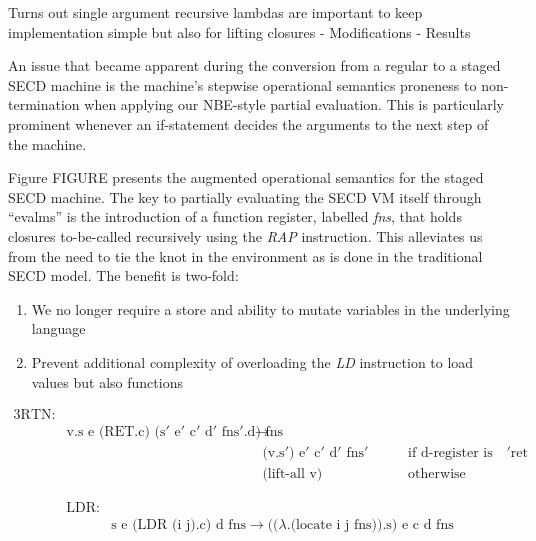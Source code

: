 \documentclass[fleqn]{article}
\theoremstyle{definition}
\begin{document}

Turns out single argument recursive lambdas are important to keep implementation simple but also for lifting closures
- Modifications
- Results

An issue that became apparent during the conversion from a regular to a staged SECD machine is the machine's stepwise operational semantics proneness to non-termination when applying our NBE-style partial evaluation. This is particularly prominent whenever an if-statement decides the arguments to the next step of the machine.

Figure FIGURE presents the augmented operational semantics for the staged SECD machine. The key to partially evaluating the SECD VM itself through ``evalms'' is the introduction of a function register, labelled \textit{fns}, that holds closures to-be-called recursively using the \textit{RAP} instruction. This alleviates us from the need to tie the knot in the environment as is done in the traditional SECD model. The benefit is two-fold:
\begin{enumerate}
	\item We no longer require a store and ability to mutate variables in the underlying language
	\item Prevent additional complexity of overloading the \textit{LD} instruction to load values but also functions
\end{enumerate}

\begin{alignat*}{3}
		\text{RTN:} &																																							\\
		& \text{v.s e (RET.c) (s$'$ e$'$ c$'$ d$'$ fns$'$.d) fns} \longrightarrow &&							\\
		&& \text{(v.s$'$) e$'$ c$'$ d$'$ fns$'$} \quad	&&& \text{if d-register is tagged with $'$ret} 	\\
		&& \text{(lift-all v)}									 \quad &&& \text{otherwise}
\end{alignat*}

\begin{equation*}
	\begin{split}
		\text{LDR:} & \\
		& \text{s e (LDR (i j).c) d fns} \longrightarrow \text{(($\lambda$.(locate i j fns)).s) e c d fns}
	\end{split}
\end{equation*}
\end{document}
